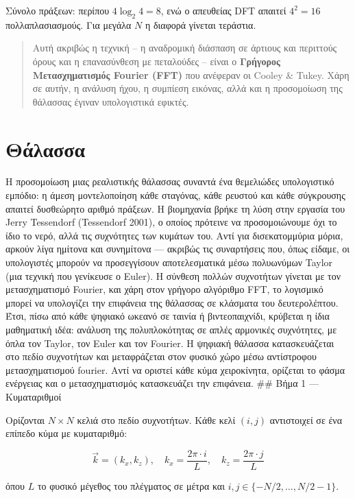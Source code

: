 \documentclass[a4paper, 11pt]{article}
\begin{document}
Σύνολο πράξεων: περίπου \(4 \log_2 4 = 8\), ενώ ο απευθείας DFT απαιτεί
\(4^2=16\) πολλαπλασιασμούς. Για μεγάλα \(N\) η διαφορά γίνεται
τεράστια.

\begin{quote}
Αυτή ακριβώς η τεχνική -- η αναδρομική διάσπαση σε άρτιους και περιττούς
όρους και η επανασύνθεση με πεταλούδες -- είναι ο \textbf{Γρήγορος
Μετασχηματισμός Fourier (FFT)} που ανέφεραν οι Cooley \& Tukey. Χάρη σε
αυτήν, η ανάλυση ήχου, η συμπίεση εικόνας, αλλά και η προσομοίωση της
θάλασσας έγιναν υπολογιστικά εφικτές.
\end{quote}

\section{Θάλασσα}\label{ux3b8ux3acux3bbux3b1ux3c3ux3c3ux3b1}

Η προσομοίωση μιας ρεαλιστικής θάλασσας συναντά ένα θεμελιώδες
υπολογιστικό εμπόδιο: η άμεση μοντελοποίηση κάθε σταγόνας, κάθε ρευστού
και κάθε σύγκρουσης απαιτεί δυσθεώρητο αριθμό πράξεων. Η βιομηχανία
βρήκε τη λύση στην εργασία του Jerry Tessendorf (Tessendorf 2001), ο
οποίος πρότεινε να προσομοιώνουμε όχι το ίδιο το νερό, αλλά τις
συχνότητες των κυμάτων του. Αντί για δισεκατομμύρια μόρια, αρκούν λίγα
ημίτονα και συνημίτονα --- ακριβώς τις συναρτήσεις που, όπως είδαμε, οι
υπολογιστές μπορούν να προσεγγίσουν αποτελεσματικά μέσω πολυωνύμων
Taylor (μια τεχνική που γενίκευσε ο Euler). Η σύνθεση πολλών συχνοτήτων
γίνεται με τον μετασχηματισμό Fourier, και χάρη στον γρήγορο αλγόριθμο
FFT, το λογισμικό μπορεί να υπολογίζει την επιφάνεια της θάλασσας σε
κλάσματα του δευτερολέπτου. Έτσι, πίσω από κάθε ψηφιακό ωκεανό σε ταινία
ή βιντεοπαιχνίδι, κρύβεται η ίδια μαθηματική ιδέα: ανάλυση της
πολυπλοκότητας σε απλές αρμονικές συχνότητες, με όπλα τον Taylor, τον
Euler και τον Fourier. Η ψηφιακή θάλασσα κατασκευάζεται στο πεδίο
συχνοτήτων και μεταφράζεται στον φυσικό χώρο μέσω αντίστροφου
μετασχηματισμού fourier. Αντί να οριστεί κάθε κύμα χειροκίνητα, ορίζεται
το φάσμα ενέργειας και ο μετασχηματισμός κατασκευάζει την επιφάνεια.
\#\# Βήμα 1 --- Κυματαριθμοί

Ορίζονται \(N \times N\) κελιά στο πεδίο συχνοτήτων. Κάθε κελί
\((i, j)\) αντιστοιχεί σε ένα επίπεδο κύμα με κυματαριθμό:

\[\vec{k} = (k_x, k_z), \quad k_x = \frac{2\pi \cdot i}{L}, \quad k_z = \frac{2\pi \cdot j}{L}\]

όπου \(L\) το φυσικό μέγεθος του πλέγματος σε μέτρα και
\(i, j \in \{-N/2, \ldots, N/2 - 1\}\).
\end{document}
